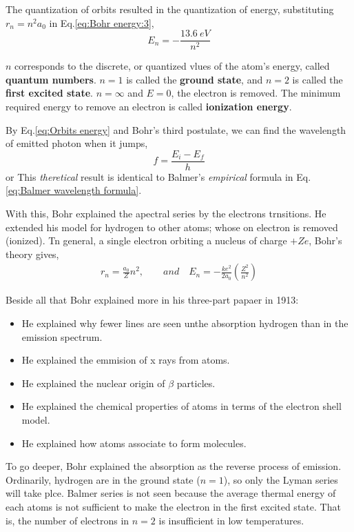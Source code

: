         The quantization of orbits resulted in the quantization of energy, substituting $r_n = n^2 a_0$ in Eq.\eqref{eq:Bohr energy:3},
        $$ E_n = - \frac{\SI{13.6}{eV}}{n^2} $$

        $n$ corresponds to the discrete, or quantized vlues of the atom's energy, called \textbf{quantum numbers}.
        $n=1$ is called the \textbf{ground state}, and $n=2$ is called the \textbf{first excited state}.
        $n= \infty$ and $E = 0$, the electron is removed. The minimum required energy to remove an electron is called \textbf{ionization energy}.
        
        By Eq.\eqref{eq:Orbits energy} and Bohr's third postulate, we can find the wavelength of emitted photon when it jumps, 
        $$ f = \frac{E_i - E_f}{h} $$
        or 
        This \textit{theretical} result is identical to Balmer's \textit{empirical} formula in Eq.\eqref{eq:Balmer wavelength formula}.

        \bulletpar With this, Bohr explained the apectral series by the electrons trnsitions. He extended his model for hydrogen to other atoms; whose on electron is 
        removed (ionized). Tn general, a single electron orbiting a nucleus of charge $+Ze$, Bohr's theory gives, 
        \begin{align}
            \label{eq:Bohr model other atoms}
            r_n =  \frac{a_0}{Z} n^2, \qquad and \quad E_n = - \frac{ke^2}{2 a_0} \left( \frac{Z^2}{n^2} \right)
        \end{align} 

        Beside all that Bohr explained more in his three-part papaer in 1913:
        \begin{itemize}
            \item He explained why fewer lines are seen unthe absorption hydrogen than  in the emission spectrum.
            \item He explained the emmision of x rays from atoms.
            \item He explained the nuclear origin of $\beta$ particles.
            \item He explained the chemical properties of atoms in terms of the electron shell model.
            \item He explained how atoms associate to form molecules.
        \end{itemize}
        \bulletpar To go deeper, Bohr explained the absorption as the reverse process of emission. Ordinarily, hydrogen are in the ground state ($n=1$), so only the Lyman series 
        will take plce. Balmer series is not seen because the average thermal energy of each atoms is not sufficient to make the electron in the first excited state. 
        That is, the number of electrons in $n=2$ is insufficient in low temperatures.

